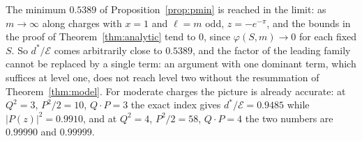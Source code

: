 \begin{remark}\label{rem:sharp}
The minimum $0.5389$ of Proposition~\ref{prop:pmin} is reached in the limit: as $m\to\infty$ along charges with $x=1$ and $\ell=m$ odd, $z=-e^{-\pi}$, and the bounds in the proof of Theorem~\ref{thm:analytic} tend to $0$, since $\varphi(S,m)\to0$ for each fixed $S$. So $d^*/\mathcal E$ comes arbitrarily close to $0.5389$, and the factor of the leading family cannot be replaced by a single term: an argument with one dominant term, which suffices at level one, does not reach level two without the resummation of Theorem~\ref{thm:model}.
For moderate charges the picture is already accurate: at $Q^2=3$, $P^2/2=10$, $Q\cdot P=3$ the exact index gives $d^*/\mathcal E=0.9485$ while $|P(z)|^2=0.9910$, and at $Q^2=4$, $P^2/2=58$, $Q\cdot P=4$ the two numbers are $0.99990$ and $0.99999$.
\end{remark}

